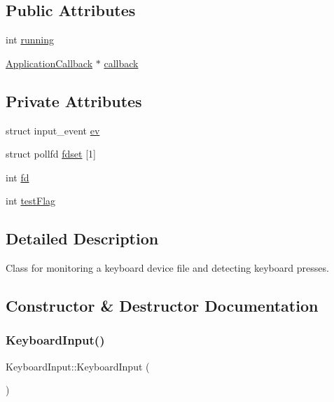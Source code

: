 \subsection*{Public Attributes}
\begin{DoxyCompactItemize}
\item 
int \hyperlink{classdrumpi_1_1KeyboardInput_a92b9933a95405da091d18b8b3116699b}{running}
\item 
\hyperlink{classdrumpi_1_1ApplicationCallback}{Application\+Callback} $\ast$ \hyperlink{classdrumpi_1_1KeyboardInput_a7af8c85eed4c1997ae9b56ac5bf2a7e1}{callback}
\end{DoxyCompactItemize}
\subsection*{Private Attributes}
\begin{DoxyCompactItemize}
\item 
struct input\+\_\+event \hyperlink{classdrumpi_1_1KeyboardInput_a2b530250c3bb5d744611671e430e283d}{ev}
\item 
struct pollfd \hyperlink{classdrumpi_1_1KeyboardInput_a94851cf204554afc60046d39a265c4e7}{fdset} \mbox{[}1\mbox{]}
\item 
int \hyperlink{classdrumpi_1_1KeyboardInput_a098990e43175ae8a2ad64e6d3b487c83}{fd}
\item 
int \hyperlink{classdrumpi_1_1KeyboardInput_a1817959cdce29597ad61ba635674bc6f}{test\+Flag}
\end{DoxyCompactItemize}


\subsection{Detailed Description}
Class for monitoring a keyboard device file and detecting keyboard presses. 

\subsection{Constructor \& Destructor Documentation}
\mbox{\label{classdrumpi_1_1KeyboardInput_a92d9c25232e73f2d9319c79df028cc69}} 
\subsubsection{\texorpdfstring{Keyboard\+Input()}{KeyboardInput()}}
{\footnotesize\ttfamily Keyboard\+Input\+::\+Keyboard\+Input (\begin{DoxyParamCaption}{ }\end{DoxyParamCaption})}



